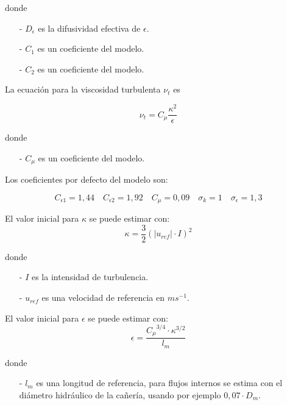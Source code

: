 donde
\begin{itemize}
  \item[-] $D_{\epsilon}$ es la difusividad efectiva de $\epsilon$.
  \item[-] $C_{1}$ es un coeficiente del modelo.
  \item[-] $C_{2}$ es un coeficiente del modelo.
\end{itemize}

La ecuación para la viscosidad turbulenta $\nu_{t}$ es

\begin{equation}\label{eq:nu_t}
  \nu_{t} = C_{\mu}\frac{\kappa^{2}}{\epsilon}
\end{equation}


donde
\begin{itemize}
        \item[-] $C_{\mu}$ es un coeficiente del modelo.
\end{itemize}

Los coeficientes por defecto del modelo son:

\begin{equation}
  C_{\epsilon 1}=1,44
  \quad
  C_{\epsilon 2}=1,92
  \quad
  C_{\mu}=0,09
  \quad
  \sigma_{k}=1
  \quad
  \sigma_{\epsilon}=1,3
\end{equation}

El valor inicial para $\kappa$ se puede estimar con:
\begin{equation}\label{eq:kappa_est}
  \kappa = \frac{3}{2} {\left( |u_{ref}| \cdot I \right)}^{2}
\end{equation}


donde
\begin{itemize}
  \item[-] $I$ es la intensidad de turbulencia.
  \item[-] $u_{ref}$ es una velocidad de referencia en $ms^{-1}$.
\end{itemize}

El valor inicial para $\epsilon$ se puede estimar con:
\begin{equation}\label{eq:epsilon_est}
  \epsilon = \frac{{C_{\mu}}^{3/4} \cdot {\kappa}^{3/2}} {l_{m}}
\end{equation}

donde
\begin{itemize}
 \item[-] $l_{m}$ es una longitud de referencia, para flujos internos se estima
con el diámetro hidráulico de la cañería, usando por ejemplo $0,07 \cdot D_{m}$.
\end{itemize}

